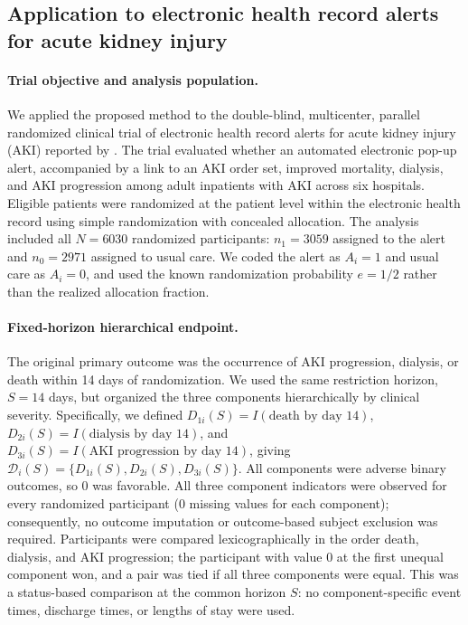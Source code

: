 \subsection{Application to electronic health record alerts for acute kidney injury}
\label{sec:trial3_application}

\paragraph{Trial objective and analysis population.}
We applied the proposed method to the double-blind, multicenter, parallel randomized
clinical trial of electronic health record alerts for acute kidney injury (AKI) reported
by \citet{wilson2021electronic}. The trial evaluated whether an automated electronic
pop-up alert, accompanied by a link to an AKI order set, improved mortality, dialysis, and
AKI progression among adult inpatients with AKI across six hospitals. Eligible patients
were randomized at the patient level within the electronic health record using simple
randomization with concealed allocation. The analysis included all $N=6030$ randomized
participants: $n_1=3059$ assigned to the alert and $n_0=2971$ assigned to usual care. We
coded the alert as $A_i=1$ and usual care as $A_i=0$, and used the known randomization
probability $e=1/2$ rather than the realized allocation fraction.

\paragraph{Fixed-horizon hierarchical endpoint.}
The original primary outcome was the occurrence of AKI progression, dialysis, or death
within 14 days of randomization. We used the same restriction horizon, $S=14$ days, but
organized the three components hierarchically by clinical severity. Specifically, we
defined $D_{1i}(S)=I(\text{death by day 14})$,
$D_{2i}(S)=I(\text{dialysis by day 14})$, and
$D_{3i}(S)=I(\text{AKI progression by day 14})$, giving
$\mathcal D_i(S)=\{D_{1i}(S),D_{2i}(S),D_{3i}(S)\}$. All components were adverse binary
outcomes, so 0 was favorable. All three component indicators were observed for every
randomized participant (0 missing values for each component); consequently, no outcome
imputation or outcome-based subject exclusion was required. Participants were compared
lexicographically in the order death, dialysis, and AKI progression; the participant with
value 0 at the first unequal component won, and a pair was tied if all three components
were equal. This was a status-based comparison at the common horizon $S$: no
component-specific event times, discharge times, or lengths of stay were used.


